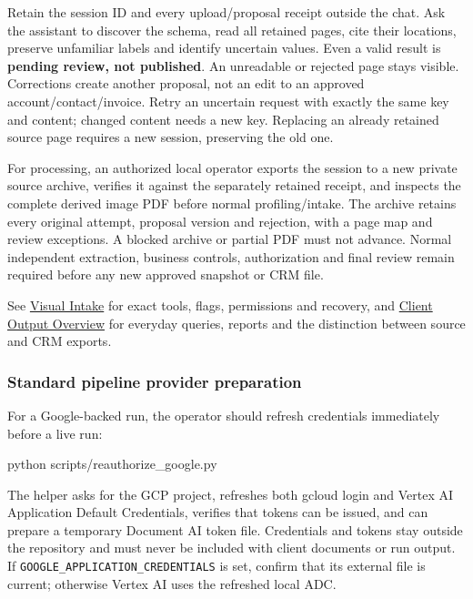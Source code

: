 \documentclass[
]{article}
\newenvironment{Shaded}{}{}
\newcommand{\ExtensionTok}[1]{#1}
\newcommand{\NormalTok}[1]{#1}
\begin{document}
Retain the session ID and every upload/proposal receipt outside the
chat. Ask the assistant to discover the schema, read all retained pages,
cite their locations, preserve unfamiliar labels and identify uncertain
values. Even a valid result is \textbf{pending review, not published}.
An unreadable or rejected page stays visible. Corrections create another
proposal, not an edit to an approved account/contact/invoice. Retry an
uncertain request with exactly the same key and content; changed content
needs a new key. Replacing an already retained source page requires a
new session, preserving the old one.

For processing, an authorized local operator exports the session to a
new private source archive, verifies it against the separately retained
receipt, and inspects the complete derived image PDF before normal
profiling/intake. The archive retains every original attempt, proposal
version and rejection, with a page map and review exceptions. A blocked
archive or partial PDF must not advance. Normal independent extraction,
business controls, authorization and final review remain required before
any new approved snapshot or CRM file.

See \href{../references/visual-ingestion.md}{Visual Intake} for exact
tools, flags, permissions and recovery, and
\href{CLIENT_OUTPUT_OVERVIEW.md}{Client Output Overview} for everyday
queries, reports and the distinction between source and CRM exports.

\subsubsection{Standard pipeline provider
preparation}\label{standard-pipeline-provider-preparation}

For a Google-backed run, the operator should refresh credentials
immediately before a live run:

\begin{Shaded}
\begin{Highlighting}[]
\ExtensionTok{python}\NormalTok{ scripts/reauthorize\_google.py}
\end{Highlighting}
\end{Shaded}

The helper asks for the GCP project, refreshes both gcloud login and
Vertex AI Application Default Credentials, verifies that tokens can be
issued, and can prepare a temporary Document AI token file. Credentials
and tokens stay outside the repository and must never be included with
client documents or run output. If
\texttt{GOOGLE\_\allowbreak{}APPLICATION\_\allowbreak{}CREDENTIALS} is
set, confirm that its external file is current; otherwise Vertex AI uses
the refreshed local ADC.
\end{document}
